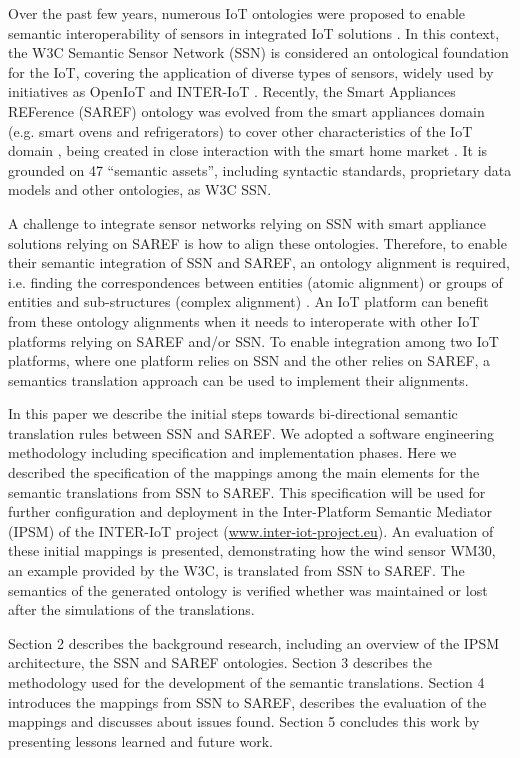 \documentclass{sig-alternate-05-2015}
\begin{document}
Over the past few years, numerous IoT ontologies were proposed to enable semantic interoperability of sensors in integrated IoT solutions \cite{Ganzha2016a}. In this context, the W3C Semantic Sensor Network (SSN) is considered an ontological foundation for the IoT, covering the application of diverse types of sensors, widely used by initiatives as OpenIoT and INTER-IoT \cite{Ganzha2017a}. 
Recently, the Smart Appliances REFerence (SAREF) ontology was evolved from the smart appliances domain (e.g. smart ovens and refrigerators) \cite{Daniele2015} to cover other characteristics of the IoT domain \cite{Daniele2016b}, being created in close interaction with the smart home market \cite{Daniele2016}. It is grounded on 47 “semantic assets”, including syntactic standards, proprietary data models and other ontologies, as W3C SSN. 

A challenge to integrate sensor networks relying on SSN with smart appliance solutions relying on SAREF is how to align these ontologies. Therefore, to enable their semantic integration of SSN and SAREF, an ontology alignment is required, i.e. finding the correspondences between entities (atomic alignment) or groups of entities and sub-structures (complex alignment) \cite{Ganzha2015}. An IoT platform can benefit from these ontology alignments when it needs to interoperate with other IoT platforms relying on SAREF and/or SSN. To enable integration among two IoT platforms, where one platform relies on SSN and the other relies on SAREF, a semantics translation approach can be used to implement their alignments.

In this paper we describe the initial steps towards bi-directional semantic translation rules between SSN and SAREF. We adopted a software engineering methodology including specification and implementation phases. Here we described the specification of the mappings among the main elements for the semantic translations from SSN to SAREF. This specification will be used for further configuration and deployment in the Inter-Platform Semantic Mediator (IPSM) of the INTER-IoT project (\url{www.inter-iot-project.eu}). An evaluation of these initial mappings is presented, demonstrating how the wind sensor WM30, an example provided by the W3C, is translated from SSN to SAREF. The semantics of the generated ontology is verified whether was maintained or lost after the simulations of the translations. 

Section 2 describes the background research, including an overview of the IPSM architecture, the SSN and SAREF ontologies. Section 3 describes the methodology used for the development of the semantic translations. Section 4 introduces the mappings from SSN to SAREF, describes the evaluation of the mappings and discusses about issues found. Section 5 concludes this work by presenting lessons learned and future work. 
\end{document}
